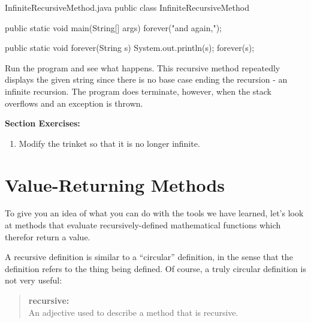 \begin{trinket} [230] {InfiniteRecursiveMethod.java}
public class InfiniteRecursiveMethod {

    public static void main(String[] args) {
       forever("and again,");
    }
    
    public static void forever(String s) {
       System.out.println(s);
       forever(s);
    }
}
\end{trinket}


Run the program and see what happens. This recursive method repeatedly displays the given string since there is no base case ending the recursion - an infinite recursion.  The program does terminate, however, when the stack overflows and an exception is thrown.

\textbf{Section Exercises:}
\begin{enumerate}
\item Modify the trinket so that it is no longer infinite.
\end{enumerate}


\section{Value-Returning Methods}
\label{factorial}

%
%

To give you an idea of what you can do with the tools we have learned, let's look at methods that evaluate recursively-defined mathematical functions which therefor return a value.

A recursive definition is similar to a ``circular'' definition, in the sense that the definition refers to the thing being defined.
Of course, a truly circular definition is not very useful:

\begin{quote}
{\bf recursive:} \\
An adjective used to describe a method that is recursive.
\end{quote}

